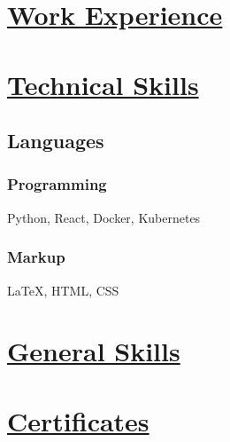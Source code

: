 \documentclass{article}
\renewcommand{\maketitle}{
\begin{document}
{\huge\bfseries
\theauthor}

\vspace{0.75em}

\noindent\hspace{0.0em} \faEnvelopeO \, reshavabraham@gmail.com \, \faGithub \, reshav-abraham@github --- \faLinkedin \, linkedin

\noindent\hspace{-0.1em} \faHome \, 160 Vroom Street, Jersey City

\noindent\hspace{0em} \faPhone \, 908-731-1426
	
\end{center}
}

\begin{document}
\section{\underline{Work Experience}}
\section{\underline{Technical Skills}}

\subsection{Languages}
\vspace{-0.3em}



\subsubsection{Programming}
Python, React, Docker, Kubernetes
\vspace{0.3em}

\subsubsection{Markup}
{\LaTeX}, HTML, CSS
\section{\underline{General Skills}}
\section{\underline{Certificates}}
\end{document}
